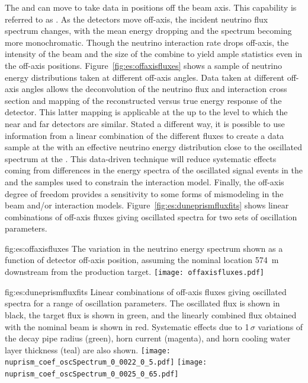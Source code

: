 The  and  can move to take data in positions off the beam axis.  This capability is referred to as . As the detectors move off-axis, the incident neutrino flux spectrum changes, with the mean energy dropping and the spectrum becoming more monochromatic.  Though the neutrino interaction rate drops off-axis, the intensity of the beam and the size of the   combine to yield ample statistics even in the off-axis positions. 
Figure~\ref{fig:es:offaxisfluxes} shows a sample of neutrino energy distributions taken at different off-axis angles.
%
Data taken at different off-axis angles allows the deconvolution of the neutrino flux and interaction cross section and mapping of the reconstructed versus true energy response of the detector.  This latter mapping is applicable at the  up to the level to which the near and far  detectors are similar.  Stated a different way, it is possible to use information from a linear combination of the different fluxes to create a data sample at the  with an effective neutrino energy distribution close to the oscillated spectrum at the .  This data-driven technique will reduce systematic effects coming from differences in the energy spectra of the oscillated signal events in the  and the  samples used to constrain the interaction model. Finally, the off-axis degree of freedom provides a sensitivity to some forms of mismodeling in the beam and/or interaction models. %
Figure~\ref{fig:es:duneprismfluxfits} shows linear combinations of off-axis fluxes giving  oscillated spectra for two sets of oscillation parameters. 


\begin{dunefigure}{fig:es:offaxisfluxes}
{The variation in the neutrino energy spectrum shown as a function of detector off-axis position, assuming the nominal  location 574~m downstream from the production target.}
\texttt{[image: offaxisfluxes.pdf]}
\end{dunefigure}
\begin{dunefigure}{fig:es:duneprismfluxfits}
{Linear combinations of off-axis fluxes giving  oscillated spectra for a range of oscillation parameters. The   oscillated flux is shown in black, the target flux is shown in green, and the linearly combined flux obtained with the nominal beam  is shown in red. Systematic effects due to 1$\,\sigma$ variations of the decay pipe radius (green), horn current (magenta), and horn cooling water layer thickness (teal) are also shown.}
	\texttt{[image: nuprism\_coef\_oscSpectrum\_0\_0022\_0\_5.pdf]}
	\texttt{[image: nuprism\_coef\_oscSpectrum\_0\_0025\_0\_65.pdf]}
\end{dunefigure}

